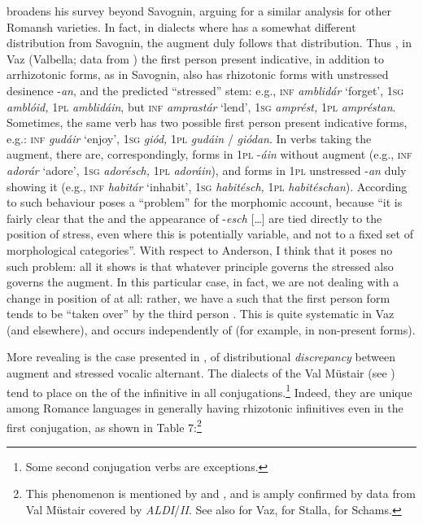 \documentclass[output=paper,
modfonts
]{LSP/langsci}
\begin{document}
\citet{anderson2013stem}broadens his survey beyond Savognin, arguing for a
similar analysis for other Romansh varieties. In fact, in dialects where
 has a somewhat different distribution from Savognin, the augment
duly follows that distribution. Thus \citet[21f.]{anderson2013stem}, in Vaz
(Valbella; data from \citealt{ebneter1981a}) the first person  present
indicative, in addition to arrhizotonic forms, as in Savognin, also has
rhizotonic forms with unstressed desinence -\emph{an}, and the predicted
``stressed'' stem: e.g., \textsc{inf} \emph{amblidár} `forget',
\textsc{1sg} \emph{amblóid,} \textsc{1pl} \emph{amblidáin}, but
\textsc{inf} \emph{amprastár} `lend', \textsc{1sg} \emph{amprést,}
\textsc{1pl} \emph{ampréstan}. Sometimes, the same verb has two possible
first person  present indicative forms, e.g.: \textsc{inf}
\emph{gudáir} `enjoy', \textsc{1sg} \emph{giód,} \textsc{1pl}
\emph{gudáin} / \emph{giódan}. In verbs taking the augment, there are,
correspondingly, forms in \textsc{1pl} -\emph{áin} without augment
(e.g., \textsc{inf} \emph{adorár} `adore', \textsc{1sg} \emph{adorésch,}
\textsc{1pl} \emph{adoráin}), and forms in \textsc{1pl} unstressed
-\emph{an} duly showing it (e.g., \textsc{inf} \emph{habitár} `inhabit',
\textsc{1sg} \emph{habitésch,} \textsc{1pl} \emph{habitéschan}).
According to \citet[23]{anderson2013stem} such behaviour poses a ``problem'' for the
morphomic account, because ``it is fairly clear that the  
and the appearance of -\emph{esch} {[}\ldots{}{]} are tied directly to
the position of stress, even where this is potentially variable, and not
to a fixed set of morphological categories''. With respect to Anderson, I
think that it poses no such problem: all it shows is that whatever
principle governs the stressed   also governs the augment.
In this particular case, in fact, we are not dealing with a change in
position of  at all: rather, we have a  such that the
first person  form tends to be ``taken over'' by the third person
. This is quite systematic in Vaz (and elsewhere), and occurs
independently of   (for example, in non-present forms).

More revealing is the case presented in \citet[45f.]{maiden2011a}, of
distributional \emph{discrepancy} between augment and stressed vocalic
alternant. The dialects of the Val Müstair (see \citealt[132]{schorta1938a}) tend
to place  on the  of the infinitive in all
conjugations.\footnote{Some second conjugation verbs are exceptions.}
Indeed, they are unique among Romance languages in generally having
rhizotonic infinitives even in the first conjugation, as shown in Table
7:\footnote{This phenomenon is mentioned by \citet[35]{sturzinger1879} and
  \citet[518f.]{huonder1901}, and is amply confirmed by data from Val Müstair
  covered by \emph{ALDI}/\emph{II}. See also \citet[222]{grisch1939a} for Vaz,
  \citet[51]{candrian1900a} for Stalla, \citet[135]{soler1991a} for Schams.}
\end{document}
